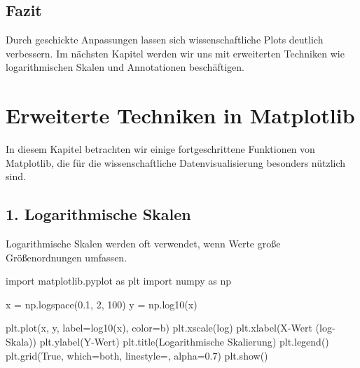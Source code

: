\documentclass[
  letterpaper,
  DIV=11,
  numbers=noendperiod]{scrreprt}
\newenvironment{Shaded}{\begin{snugshade}}{\end{snugshade}}
\newcommand{\DecValTok}[1]{\textcolor[rgb]{0.68,0.00,0.00}{#1}}
\newcommand{\FloatTok}[1]{\textcolor[rgb]{0.68,0.00,0.00}{#1}}
\newcommand{\ImportTok}[1]{\textcolor[rgb]{0.00,0.46,0.62}{#1}}
\newcommand{\NormalTok}[1]{\textcolor[rgb]{0.00,0.23,0.31}{#1}}
\newcommand{\OperatorTok}[1]{\textcolor[rgb]{0.37,0.37,0.37}{#1}}
\newcommand{\StringTok}[1]{\textcolor[rgb]{0.13,0.47,0.30}{#1}}
\newcommand{\VariableTok}[1]{\textcolor[rgb]{0.07,0.07,0.07}{#1}}
\begin{document}
\begin{tcolorbox}
\section{Fazit}\label{fazit-1}

Durch geschickte Anpassungen lassen sich wissenschaftliche Plots
deutlich verbessern. Im nächsten Kapitel werden wir uns mit erweiterten
Techniken wie logarithmischen Skalen und Annotationen beschäftigen.

\chapter{Erweiterte Techniken in
Matplotlib}\label{erweiterte-techniken-in-matplotlib}

In diesem Kapitel betrachten wir einige fortgeschrittene Funktionen von
Matplotlib, die für die wissenschaftliche Datenvisualisierung besonders
nützlich sind.

\section{1. Logarithmische Skalen}\label{logarithmische-skalen}

Logarithmische Skalen werden oft verwendet, wenn Werte große
Größenordnungen umfassen.

\begin{Shaded}
\begin{Highlighting}[]
\ImportTok{import}\NormalTok{ matplotlib.pyplot }\ImportTok{as}\NormalTok{ plt}
\ImportTok{import}\NormalTok{ numpy }\ImportTok{as}\NormalTok{ np}

\NormalTok{x }\OperatorTok{=}\NormalTok{ np.logspace(}\FloatTok{0.1}\NormalTok{, }\DecValTok{2}\NormalTok{, }\DecValTok{100}\NormalTok{)}
\NormalTok{y }\OperatorTok{=}\NormalTok{ np.log10(x)}

\NormalTok{plt.plot(x, y, label}\OperatorTok{=}\StringTok{\textquotesingle{}log10(x)\textquotesingle{}}\NormalTok{, color}\OperatorTok{=}\StringTok{\textquotesingle{}b\textquotesingle{}}\NormalTok{)}
\NormalTok{plt.xscale(}\StringTok{\textquotesingle{}log\textquotesingle{}}\NormalTok{)}
\NormalTok{plt.xlabel(}\StringTok{\textquotesingle{}X{-}Wert (log{-}Skala)\textquotesingle{}}\NormalTok{)}
\NormalTok{plt.ylabel(}\StringTok{\textquotesingle{}Y{-}Wert\textquotesingle{}}\NormalTok{)}
\NormalTok{plt.title(}\StringTok{\textquotesingle{}Logarithmische Skalierung\textquotesingle{}}\NormalTok{)}
\NormalTok{plt.legend()}
\NormalTok{plt.grid(}\VariableTok{True}\NormalTok{, which}\OperatorTok{=}\StringTok{\textquotesingle{}both\textquotesingle{}}\NormalTok{, linestyle}\OperatorTok{=}\StringTok{\textquotesingle{}{-}{-}\textquotesingle{}}\NormalTok{, alpha}\OperatorTok{=}\FloatTok{0.7}\NormalTok{)}
\NormalTok{plt.show()}
\end{Highlighting}
\end{Shaded}


\end{tcolorbox}
\end{document}

